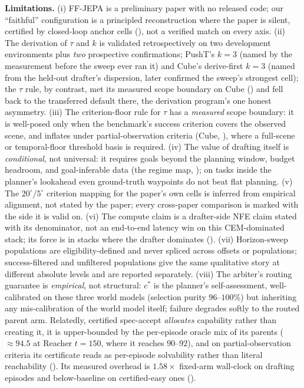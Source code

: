 \documentclass{article}
\newcommand{\degc}[1]{$#1^\circ$}
\begin{document}
\textbf{Limitations.} (i) FF-JEPA is a preliminary paper with no released code; our
``faithful'' configuration is a principled reconstruction where the paper is silent,
certified by closed-loop anchor cells (), not a verified match on every
axis. (ii) The derivation of $\tau$ and $k$ is validated retrospectively on two
development environments plus \emph{two} prospective confirmations; PushT's
$k{=}3$ (named by the measurement before the sweep ever ran it) and Cube's
derive-first $k{=}3$ (named from the held-out drafter's dispersion, later confirmed
the sweep's strongest cell); the $\tau$ rule, by contrast, met its measured scope
boundary on Cube () and fell back to the transferred
default there, the derivation program's one honest asymmetry. (iii) The criterion-floor rule
for $\tau$ has a \emph{measured} scope boundary: it is well-posed only when the
benchmark's success criterion covers the observed scene, and inflates under
partial-observation criteria (Cube, ), where a full-scene or
temporal-floor threshold basis is required. (iv) The value of drafting itself is
\emph{conditional}, not universal: it requires goals beyond the planning window, budget
headroom, and goal-inferable data (the regime map, ); on tasks
inside the planner's lookahead even ground-truth waypoints do not beat flat planning.
(v) The \degc{20}/\degc{5} criterion mapping for the paper's own cells is inferred from
empirical alignment, not stated by the paper; every cross-paper comparison is marked
with the side it is valid on. (vi) The compute claim is a drafter-side NFE claim stated
with its denominator, not an end-to-end latency win on this CEM-dominated stack; its
force is in stacks where the drafter dominates (). (vii)
Horizon-sweep populations are eligibility-defined and never spliced across offsets or
populations; success-filtered and unfiltered populations give the same qualitative
story at different absolute levels and are reported separately. (viii) The
arbiter's routing guarantee is \emph{empirical}, not structural: $c^{*}$ is the
planner's self-assessment, well-calibrated on these three world models (selection
purity $96$--$100\%$) but inheriting any mis-calibration of the world model itself;
failure degrades softly to the routed parent arm. Relatedly, certified spec-accept
\emph{allocates} capability rather than creating it, it is upper-bounded by the
per-episode oracle mix of its parents (${\approx}94.5$ at Reacher $t{=}150$, where it
reaches $90$--$92$), and on partial-observation criteria its certificate reads as
per-episode solvability rather than literal reachability
(). Its measured overhead is $1.58\times$ fixed-arm
wall-clock on drafting episodes and below-baseline on certified-easy ones
().
\end{document}
